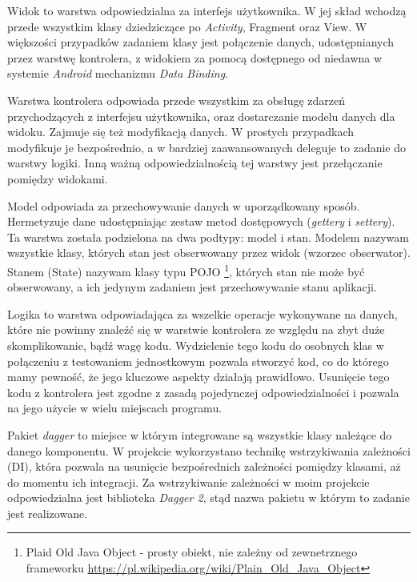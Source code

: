 \documentclass[openright]{xmgr}
\begin{document}
Widok to warstwa odpowiedzialna za interfejs użytkownika. W jej skład wchodzą przede wszystkim klasy dziedziczące po \textit{Activity}, Fragment oraz View. W większości przypadków zadaniem klasy jest połączenie danych, udostępnianych przez warstwę kontrolera, z widokiem za pomocą dostępnego od niedawna w systemie \textit{Android} mechanizmu \textit{Data Binding}\cite{AndroidSDK:2017:Doc}.

Warstwa kontrolera odpowiada przede wszystkim za obsługę zdarzeń przychodzących z interfejsu użytkownika, oraz dostarczanie modelu danych dla widoku. Zajmuje się też modyfikacją danych. W prostych przypadkach modyfikuje je bezpośrednio, a w bardziej zaawansowanych deleguje to zadanie do warstwy logiki. Inną ważną odpowiedzialnością tej warstwy jest przełączanie pomiędzy widokami. 

Model odpowiada za przechowywanie danych w uporządkowany sposób. Hermetyzuje dane udostępniając zestaw metod dostępowych (\textit{gettery} i \textit{settery}). Ta warstwa została podzielona na dwa podtypy: model i stan. Modelem nazywam wszystkie klasy, których stan jest obserwowany przez widok (wzorzec obserwator). Stanem (State) nazywam klasy typu POJO \footnote{Plaid Old Java Object - prosty obiekt, nie zależny od zewnetrznego frameworku \url{https://pl.wikipedia.org/wiki/Plain_Old_Java_Object}}, których stan nie może być obserwowany, a ich jedynym zadaniem jest przechowywanie stanu aplikacji. 

Logika to warstwa odpowiadająca za wszelkie operacje wykonywane na danych, które nie powinny znaleźć się w warstwie kontrolera ze względu na zbyt duże skomplikowanie, bądź wagę kodu. Wydzielenie tego kodu do osobnych klas w połączeniu z testowaniem jednostkowym pozwala stworzyć kod, co do którego mamy pewność, że jego kluczowe aspekty działają prawidłowo. Usunięcie tego kodu z kontrolera jest zgodne z zasadą pojedynczej odpowiedzialności \cite{CleanCode:2005} i pozwala na jego użycie w wielu miejscach programu. 

Pakiet \textit{dagger} to miejsce w którym integrowane są wszystkie klasy należące do danego komponentu. W projekcie wykorzystano technikę wstrzykiwania zależności (DI), która pozwala na usunięcie bezpośrednich zależności pomiędzy klasami, aż do momentu ich integracji. Za wstrzykiwanie zależności w moim projekcie odpowiedzialna jest biblioteka \textit{Dagger 2}, stąd nazwa pakietu w którym to zadanie jest realizowane.
\end{document}
